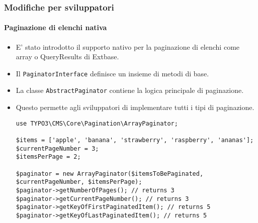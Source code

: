 
\begin{frame}[fragile]
	\frametitle{Modifiche per sviluppatori}
	\framesubtitle{Paginazione di elenchi nativa}

	\lstset{basicstyle=\tiny\ttfamily}

	\begin{itemize}
		\item E' stato introdotto il supporto nativo per la paginazione di elenchi come array o QueryResults di Extbase.
		\item Il \texttt{PaginatorInterface} definisce un insieme di metodi di base.
		\item La classe \texttt{AbstractPaginator} contiene la logica principale di paginazione.
		\item Questo permette agli sviluppatori di implementare tutti i tipi di paginazione.
\begin{lstlisting}
use TYPO3\CMS\Core\Pagination\ArrayPaginator;

$items = ['apple', 'banana', 'strawberry', 'raspberry', 'ananas'];
$currentPageNumber = 3;
$itemsPerPage = 2;

$paginator = new ArrayPaginator($itemsToBePaginated, $currentPageNumber, $itemsPerPage);
$paginator->getNumberOfPages(); // returns 3
$paginator->getCurrentPageNumber(); // returns 3
$paginator->getKeyOfFirstPaginatedItem(); // returns 5
$paginator->getKeyOfLastPaginatedItem(); // returns 5
\end{lstlisting}

	\end{itemize}

\end{frame}


